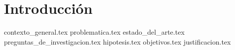 \section{Introducción}

{contexto_general.tex}
{problematica.tex}
{estado_del_arte.tex}
{preguntas_de_investigacion.tex}
{hipotesis.tex}
{objetivos.tex}
{justificacion.tex}
